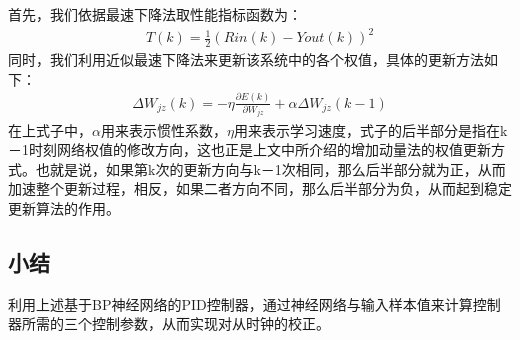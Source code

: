 首先，我们依据最速下降法取性能指标函数为：
\begin{align}
T(k) = \frac{1}{2}(Rin(k) - Yout(k))^{2}
\end{align}
同时，我们利用近似最速下降法来更新该系统中的各个权值，具体的更新方法如下：
\begin{align}
\Delta W_{jz}(k) = -\eta \frac{\partial E(k)}{\partial W_{jz}} + \alpha \Delta W_{jz}(k-1)
\end{align}
在上式子中，$\alpha$用来表示惯性系数，$\eta$用来表示学习速度，式子的后半部分是指在k－1时刻网络权值的修改方向，这也正是上文中所介绍的增加动量法的权值更新方式。也就是说，如果第k次的更新方向与k－1次相同，那么后半部分就为正，从而加速整个更新过程，相反，如果二者方向不同，那么后半部分为负，从而起到稳定更新算法的作用。

\subsection{小结}
利用上述基于BP神经网络的PID控制器，通过神经网络与输入样本值来计算控制器所需的三个控制参数，从而实现对从时钟的校正。









